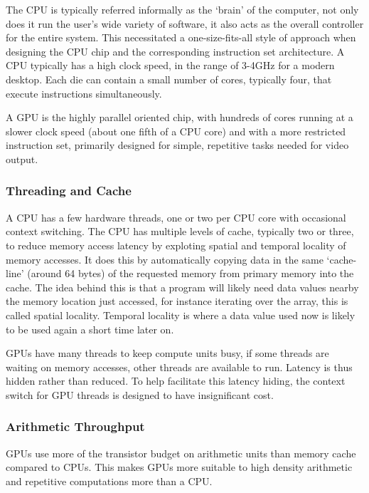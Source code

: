 The CPU is typically referred informally as the `brain' of the computer, not
only does it run the user's wide variety of software, it also acts as the
overall controller for the entire system. This necessitated a one-size-fits-all
style of approach when designing the CPU chip and the corresponding instruction
set architecture. A CPU typically has a high clock speed, in the range of 3-4GHz
for a modern desktop. Each die can contain a small number of cores, typically
four, that execute instructions simultaneously.

A GPU is the highly parallel oriented chip, with hundreds of cores running at a
slower clock speed (about one fifth of a CPU core) and with a more restricted
instruction set, primarily designed for simple, repetitive tasks needed for
video output.

\subsubsection{Threading and Cache}

A CPU has a few hardware threads, one or two per CPU core with occasional
context switching. The CPU has multiple levels of cache, typically two or three,
to reduce memory access latency by exploting spatial and temporal locality of
memory accesses. It does this by automatically copying data in the same
`cache-line' (around 64 bytes) of the requested memory from primary memory into
the cache. The idea behind this is that a program will likely need data values
nearby the memory location just accessed, for instance iterating over the array,
this is called spatial locality. Temporal locality is where a data value used
now is likely to be used again a short time later on.

GPUs have many threads to keep compute units busy, if some threads are waiting
on memory accesses, other threads are available to run. Latency is thus hidden
rather than reduced. To help facilitate this latency hiding, the context switch
for GPU threads is designed to have insignificant cost.

\subsubsection{Arithmetic Throughput}

GPUs use more of the transistor budget on arithmetic units than memory cache
compared to CPUs. This makes GPUs more suitable to high density arithmetic and
repetitive computations more than a CPU.

